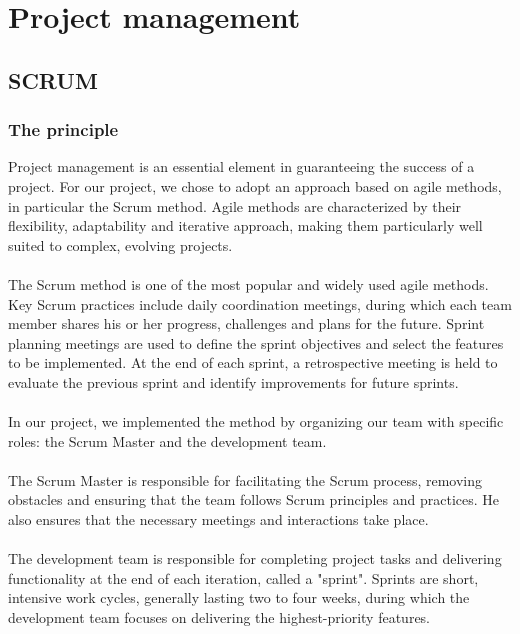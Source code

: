 \chapter{Project management}
\section{SCRUM}
\subsection{The principle}
Project management is an essential element in guaranteeing the success of a project. For our project, we chose to adopt an approach based on agile methods, in particular the Scrum method. Agile methods are characterized by their flexibility, adaptability and iterative approach, making them particularly well suited to complex, evolving projects.\\
\\
The Scrum method is one of the most popular and widely used agile methods. Key Scrum practices include daily coordination meetings, during which each team member shares his or her progress, challenges and plans for the future. Sprint planning meetings are used to define the sprint objectives and select the features to be implemented. At the end of each sprint, a retrospective meeting is held to evaluate the previous sprint and identify improvements for future sprints.\\
\\
In our project, we implemented the method by organizing our team with specific roles: the Scrum Master and the development team.\\
\\
The Scrum Master is responsible for facilitating the Scrum process, removing obstacles and ensuring that the team follows Scrum principles and practices. He also ensures that the necessary meetings and interactions take place.\\
\\
The development team is responsible for completing project tasks and delivering functionality at the end of each iteration, called a "sprint". Sprints are short, intensive work cycles, generally lasting two to four weeks, during which the development team focuses on delivering the highest-priority features.\\
\\

